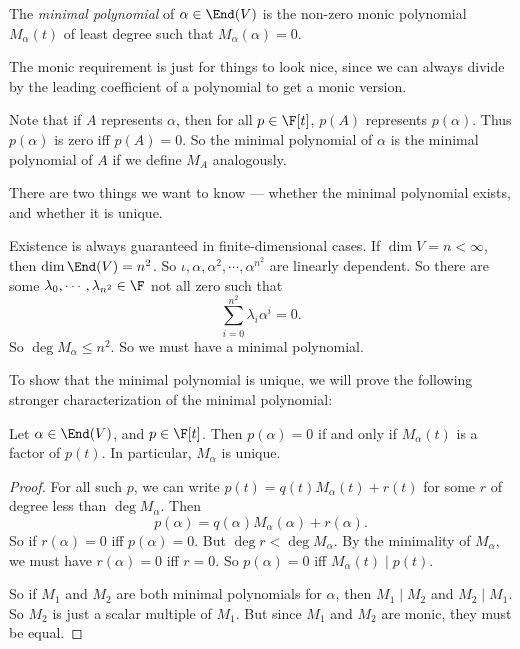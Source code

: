 \documentclass[a4paper]{article}
\begin{document}
\begin{defi}
  The \emph{minimal polynomial} of $\alpha \in \End(V)$ is the non-zero monic polynomial $M_\alpha(t)$ of least degree such that $M_\alpha(\alpha) = 0$.
\end{defi}
The monic requirement is just for things to look nice, since we can always divide by the leading coefficient of a polynomial to get a monic version.

Note that if $A$ represents $\alpha$, then for all $p \in \F[t]$, $p(A)$ represents $p(\alpha)$. Thus $p(\alpha)$ is zero iff $p(A) = 0$. So the minimal polynomial of $\alpha$ is the minimal polynomial of $A$ if we define $M_A$ analogously.

There are two things we want to know --- whether the minimal polynomial exists, and whether it is unique.

Existence is always guaranteed in finite-dimensional cases. If $\dim V = n < \infty$, then $\dim \End(V) = n^2$. So $\iota, \alpha, \alpha^2, \cdots, \alpha^{n^2}$ are linearly dependent. So there are some $\lambda_0, \cdots, \lambda_{n^2} \in \F$ not all zero such that
\[
  \sum_{i = 0}^{n^2} \lambda_i \alpha^i = 0.
\]
So $\deg M_\alpha \leq n^2$. So we must have a minimal polynomial.

To show that the minimal polynomial is unique, we will prove the following stronger characterization of the minimal polynomial:
\begin{lemma}
  Let $\alpha \in \End(V)$, and $p \in \F[t]$. Then $p(\alpha) = 0$ if and only if $M_\alpha(t)$ is a factor of $p(t)$. In particular, $M_\alpha$ is unique.
\end{lemma}

\begin{proof}
  For all such $p$, we can write $p(t) = q(t) M_\alpha(t) + r(t)$ for some $r$ of degree less than $\deg M_\alpha$. Then
  \[
    p(\alpha) = q(\alpha) M_\alpha(\alpha) + r(\alpha).
  \]
  So if $r(\alpha) = 0$ iff $p(\alpha) = 0$. But $\deg r < \deg M_\alpha$. By the minimality of $M_\alpha$, we must have $r(\alpha) = 0$ iff $r = 0$. So $p(\alpha) = 0$ iff $M_\alpha(t) \mid p(t)$.

  So if $M_1$ and $M_2$ are both minimal polynomials for $\alpha$, then $M_1 \mid M_2$ and $M_2 \mid M_1$. So $M_2$ is just a scalar multiple of $M_1$. But since $M_1$ and $M_2$ are monic, they must be equal.
\end{proof}
\end{document}
